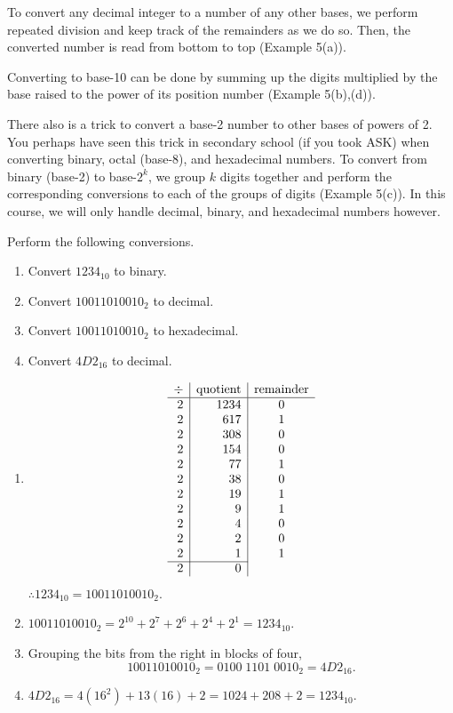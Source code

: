 To convert any decimal integer to a number of any other bases, we perform repeated division and keep track of the remainders as we do so. Then, the converted number is read from bottom to top (Example 5(a)).

\medskip
Converting to base-10 can be done by summing up the digits multiplied by the base raised to the power of its position number (Example 5(b),(d)).

\medskip
There also is a trick to convert a base-2 number to other bases of powers of 2. You perhaps have seen this trick in secondary school (if you took ASK) when converting binary, octal (base-8), and hexadecimal numbers. 
To convert from binary (base-2) to base-$2^k$, we group $k$ digits together and perform the corresponding conversions to each of the groups of digits (Example 5(c)). In this course, we will only handle decimal, binary, and hexadecimal numbers however.

\begin{example}
Perform the following conversions.
\begin{enumerate}[label=(\alph*),leftmargin=2.6em]
  \item Convert $1234_{10}$ to binary.
  \item Convert $10011010010_2$ to decimal.
  \item Convert $10011010010_2$ to hexadecimal.
  \item Convert $4D2_{16}$ to decimal.
\end{enumerate}
\end{example}

\newpage
\begin{solution}[8.0cm]
\begin{enumerate}[label=(\alph*),leftmargin=2.6em]
\item
\[
\begin{array}{r|r|c}
\div & \text{quotient} & \text{remainder}\\
\hline
2 & 1234 & 0\\
2 &  617 & 1\\
2 &  308 & 0\\
2 &  154 & 0\\
2 &   77 & 1\\
2 &   38 & 0\\
2 &   19 & 1\\
2 &    9 & 1\\
2 &    4 & 0\\
2 &    2 & 0\\
2 &    1 & 1\\
\cline{1-2}
2 &    0 & \\
\end{array}
\]
$\therefore 1234_{10}=10011010010_2.$
\item $10011010010_2=2^{10}+2^7+2^6+2^4+2^1=1234_{10}.$
\item Grouping the bits from the right in blocks of four,
\[
 10011010010_2=0100\;1101\;0010_2=4D2_{16}.
\]
\item $4D2_{16}=4(16^2)+13(16)+2=1024+208+2=1234_{10}.$
\end{enumerate}
\end{solution}

